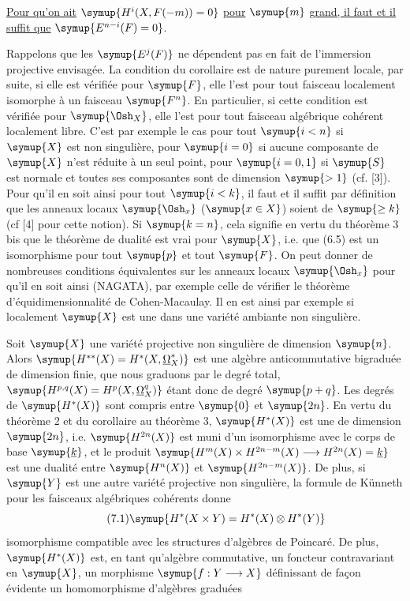  \uline{Pour qu'on ait} $\symup{H^{i}(X,F(-m))=0}$ \uline{pour} $\symup{m}$ \uline{grand, il
faut et il suffit que} $\symup{E^{n-i}(F)=0}$.

Rappelons que les $\symup{E^{j}(F)}$ ne dépendent pas en fait de l'immersion projective
envisagée. La condition du corollaire est de nature purement locale, par suite,
si elle est vérifiée pour $\symup{F}$, elle l'est pour tout faisceau localement
isomorphe à un faisceau $\symup{F^{n}}$. En particulier, si cette condition est vérifiée
pour $\symup{\Osh_X}$, elle l'est pour tout faisceau algébrique cohérent localement
libre. C'est par exemple le cas pour tout $\symup{i<n}$ si $\symup{X}$ est non singulière, pour
$\symup{i=0}$ si aucune composante de $\symup{X}$ n'est réduite à un seul point, pour $\symup{i=0,1}$
si $\symup{S}$ est normale et toutes ses composantes sont de dimension $\symup{>1}$ (cf.
[3]). Pour qu'il en soit ainsi pour tout
$\symup{i<k}$, il faut et il suffit par définition que les anneaux locaux
$\symup{\Osh_x}$ ($\symup{x\in X}$) soient de  $\symup{\geq k}$ (cf [4]
pour cette notion). Si $\symup{k=n}$, cela signifie en vertu du théorème 3 bis que le
théorème de dualité est vrai pour $\symup{X}$, i.e. que (6.5) est un isomorphisme pour
tout $\symup{p}$ et tout $\symup{F}$. On peut donner de nombreuses conditions équivalentes sur
les anneaux locaux $\symup{\Osh_x}$ pour qu'il en soit ainsi (NAGATA), par exemple celle
de vérifier le théorème d'équidimensionnalité de Cohen-Macaulay. Il en est ainsi
par exemple si localement $\symup{X}$ est une  dans une
variété ambiante non singulière.


Soit $\symup{X}$ une variété projective non singulière de dimension $\symup{n}$. Alors
$\symup{H^{**}(X)=H^{*}(X,\underline{\Omega}_X^{*})}$ est une algèbre anticommutative bigraduée de dimension finie, que nous graduons
par le degré total, $\symup{H^{p,q}(X)=H^{p}(X,\underline{\Omega}_X^{q})}$ étant donc de degré
$\symup{p+q}$. Les degrés de $\symup{H^{*}(X)}$ sont compris entre $\symup{0}$ et $\symup{2n}$. En vertu du
théorème 2 et du corollaire au théorème 3, $\symup{H^{*}(X)}$ est une  de dimension $\symup{2n}$, i.e. $\symup{H^{2n}(X)}$ est muni d'un isomorphisme avec
le corps de base $\symup{\underline{k}}$, et le produit
$\symup{H^{m}(X)\times H^{2n-m}(X)\longrightarrow H^{2n}(X)=\underline{k}}$ est une dualité entre $\symup{H^{n}(X)}$ et $\symup{H^{2n-m}(X)}$. De plus, si $\symup{Y}$ est une
autre variété projective non singulière, la formule de Künneth pour les
faisceaux algébriques cohérents donne
\begin{equation}\tag{7.1}
  \symup{H^{*}(X\times Y)=H^{*}(X)\otimes H^{*}(Y)}
\end{equation}
isomorphisme compatible avec les structures d'algèbres de Poincaré. De plus,
$\symup{H^{*}(X)}$ est, en tant qu'algèbre commutative, un foncteur contravariant en
$\symup{X}$, un morphisme $\symup{f:Y\longrightarrow X}$ définissant de façon évidente un
homomorphisme d'algèbres graduées

